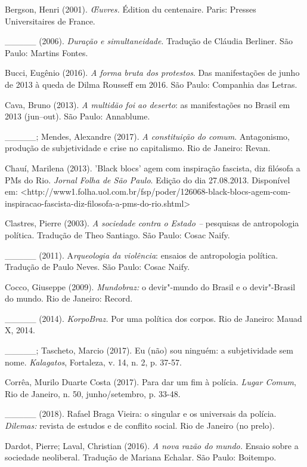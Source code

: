 Bergson, Henri (2001). \emph{Œuvres. }Édition du centenaire. Paris:
Presses Universitaires de France.

\_\_\_\_\_ (2006). \emph{Duração e simultaneidade}. Tradução de Cláudia
Berliner. São Paulo: Martins Fontes.

Bucci, Eugênio (2016). \emph{A forma bruta dos protestos}. Das
manifestações de junho de 2013 à queda de Dilma Rousseff em 2016. São
Paulo: Companhia das Letras.

Cava, Bruno (2013). \emph{A multidão foi ao deserto}: as manifestações
no Brasil em 2013 (jun--out). São Paulo: Annablume.

\_\_\_\_\_; Mendes, Alexandre (2017). \emph{A constituição do comum}.
Antagonismo, produção de subjetividade e crise no capitalismo. Rio de
Janeiro: Revan.

Chauí, Marilena (2013). 'Black blocs' agem com inspiração fascista, diz
filósofa a PMs do Rio. \emph{Jornal Folha de São Paulo}. Edição do dia
27.08.2013. Disponível em:
\textless{}http://www1.folha.uol.com.br/fsp/poder/126068-black-blocs-agem-com-inspiracao-fascista-diz-filosofa-a-pms-do-rio.shtml\textgreater{}

Clastres, Pierre (2003). \emph{A sociedade contra o Estado --} pesquisas
de antropologia política. Tradução de Theo Santiago. São Paulo: Cosac
Naify.

\_\_\_\_\_ (2011). A\emph{rqueologia da violência}: ensaios de
antropologia política. Tradução de Paulo Neves. São Paulo: Cosac Naify.

Cocco, Giuseppe (2009). \emph{Mundobraz: }o devir"-mundo do Brasil e o
devir"-Brasil do mundo. Rio de Janeiro: Record.

\_\_\_\_\_ (2014). \emph{KorpoBraz.} Por uma política dos corpos. Rio de
Janeiro: Mauad X, 2014.

\_\_\_\_\_; Tascheto, Marcio (2017). Eu (não) sou ninguém: a
subjetividade sem nome. \emph{Kalagatos}, Fortaleza, v. 14, n. 2, p.
37-57.

Corrêa, Murilo Duarte Costa (2017). Para dar um fim à polícia.
\emph{Lugar Comum}, Rio de Janeiro, n. 50, junho/setembro, p. 33-48.

\_\_\_\_\_ (2018). Rafael Braga Vieira: o singular e os universais da
polícia.\emph{ Dilemas: }revista de estudos e de conflito social. Rio de
Janeiro (no prelo).

Dardot, Pierre; Laval, Christian (2016). \emph{A nova razão do mundo.
}Ensaio sobre a sociedade neoliberal. Tradução de Mariana Echalar. São
Paulo: Boitempo.

